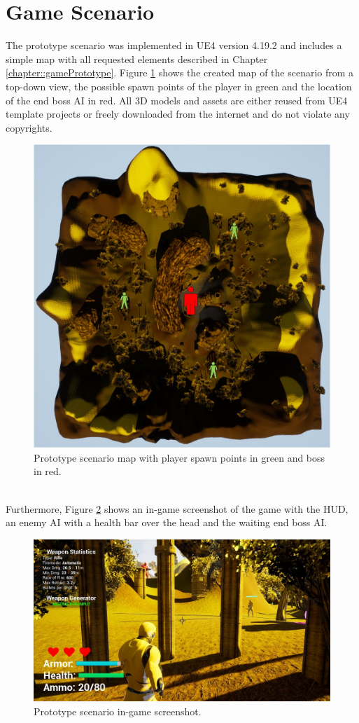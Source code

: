 \documentclass[MGS,Master,english]{twbook}%
\begin{document}
\section{Game Scenario}
The prototype scenario was implemented in UE4 version 4.19.2 and includes a simple map with all requested elements described in Chapter \ref{chapter::gamePrototype}. Figure \ref{scenarioMap} shows the created map of the scenario from a top-down view, the possible spawn points of the player in green and the location of the end boss AI in red. All 3D models and assets are either reused from UE4 template projects or freely downloaded from the internet and do not violate any copyrights.
\begin{figure}[!ht]
	\centering
	\includegraphics[width=0.6\linewidth]{PICs/Prototype/map_with_spawnpoints_and_boss}
	\caption{Prototype scenario map with player spawn points in green and boss in red.} \label{scenarioMap}
\end{figure}\\
Furthermore, Figure \ref{scenarioScreenshot} shows an in-game screenshot of the game with the HUD, an enemy AI with a health bar over the head and the waiting end boss AI.
\begin{figure}[!ht]
	\centering
	\includegraphics[width=1.0\linewidth]{PICs/Prototype/ingame_screenshot_small}
	\caption{Prototype scenario in-game screenshot.} \label{scenarioScreenshot}
\end{figure}
\end{document}
